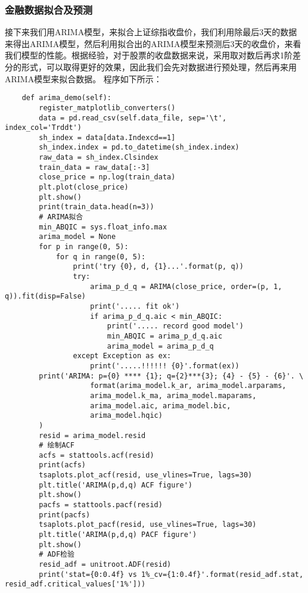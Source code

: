 \subsubsection{金融数据拟合及预测}
接下来我们用ARIMA模型，来拟合上证综指收盘价，我们利用除最后3天的数据来得出ARIMA模型，然后利用拟合出的ARIMA模型来预测后3天的收盘价，来看我们模型的性能。根据经验，对于股票的收盘数据来说，采用取对数后再求1阶差分的形式，可以取得更好的效果，因此我们会先对数据进行预处理，然后再来用ARIMA模型来拟合数据。\newline
程序如下所示：
\begin{lstlisting}
    def arima_demo(self):
        register_matplotlib_converters()
        data = pd.read_csv(self.data_file, sep='\t', index_col='Trddt')
        sh_index = data[data.Indexcd==1]
        sh_index.index = pd.to_datetime(sh_index.index)
        raw_data = sh_index.Clsindex
        train_data = raw_data[:-3]
        close_price = np.log(train_data)
        plt.plot(close_price)
        plt.show()
        print(train_data.head(n=3))
        # ARIMA拟合
        min_ABQIC = sys.float_info.max
        arima_model = None
        for p in range(0, 5):
            for q in range(0, 5):
                print('try {0}, d, {1}...'.format(p, q))
                try:
                    arima_p_d_q = ARIMA(close_price, order=(p, 1, q)).fit(disp=False)
                    print('..... fit ok')
                    if arima_p_d_q.aic < min_ABQIC:
                        print('..... record good model')
                        min_ABQIC = arima_p_d_q.aic
                        arima_model = arima_p_d_q
                except Exception as ex:
                    print('.....!!!!!! {0}'.format(ex))
        print('ARIMA: p={0} **** {1}; q={2}***{3}; {4} - {5} - {6}'. \
                    format(arima_model.k_ar, arima_model.arparams, 
                    arima_model.k_ma, arima_model.maparams, 
                    arima_model.aic, arima_model.bic, 
                    arima_model.hqic)
        )
        resid = arima_model.resid
        # 绘制ACF
        acfs = stattools.acf(resid)
        print(acfs)
        tsaplots.plot_acf(resid, use_vlines=True, lags=30)
        plt.title('ARIMA(p,d,q) ACF figure')
        plt.show()
        pacfs = stattools.pacf(resid)
        print(pacfs)
        tsaplots.plot_pacf(resid, use_vlines=True, lags=30)
        plt.title('ARIMA(p,d,q) PACF figure')
        plt.show()
        # ADF检验
        resid_adf = unitroot.ADF(resid)
        print('stat={0:0.4f} vs 1%_cv={1:0.4f}'.format(resid_adf.stat, resid_adf.critical_values['1%']))

\end{lstlisting}
